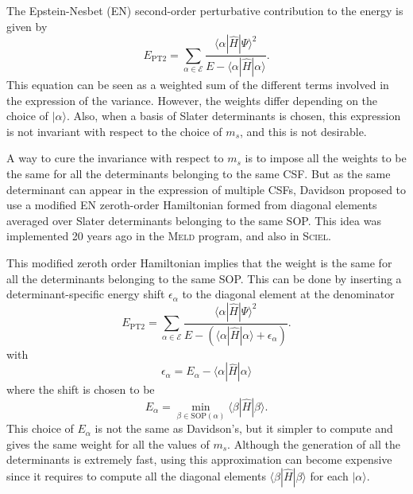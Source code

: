 \documentclass[aip,jcp,reprint,showkeys]{revtex4-1}
\newcommand{\ket}[1]{|#1\rangle}
\newcommand{\sop}{SOP}
\newcommand{\csf}{CSF}
\newcommand{\mel}[3]{\langle #1 | #2 | #3 \rangle}
\newcommand{\ept}{E_\text{PT2}}
\begin{document}
The Epstein-Nesbet (EN) second-order perturbative contribution to the energy is given
by
\begin{equation}
\ept = \sum_{\alpha \in \mathcal{E}} \frac{\mel{\alpha}{\hat{H}}{\Psi}^2}{E-\mel{\alpha}{\hat{H}}{\alpha}}.
\label{eq:pt2}
\end{equation}
This equation can be seen as a weighted sum of the different terms involved in
the expression of the variance. However, the weights differ depending on the
choice of $\ket{\alpha}$. Also, when a basis of Slater determinants is chosen,
this expression is not invariant with respect to the choice of $m_s$, and this 
is not desirable.

A way to cure the invariance with respect to $m_s$ is to impose all the weights
to be the same for all the determinants belonging to the same \csf . But as 
the same determinant can appear in the expression of multiple \csf s, Davidson
proposed to use a modified EN zeroth-order Hamiltonian formed from
diagonal elements averaged over Slater determinants belonging to the same
\sop . This idea was implemented 20 years ago in the \textsc{Meld} 
program,\cite{Davidson_1979,Kozlowski_1994} and also in \textsc{Sciel}.\cite{Sciel}

This modified zeroth order Hamiltonian implies that the weight is the same for
all the determinants belonging to the same \sop . This can be done by
inserting a determinant-specific energy shift $\epsilon_\alpha$ to the
diagonal element at the denominator 
\begin{equation}
\ept = \sum_{\alpha \in \mathcal{E}} \frac{\mel{\alpha}{\hat{H}}{\Psi}^2}{E-\left(\mel{\alpha}{\hat{H}}{\alpha}+\epsilon_\alpha \right)}.
\end{equation}
with
\begin{equation}
\epsilon_\alpha = E_\alpha - \mel{\alpha}{\hat{H}}{\alpha} 
\end{equation}
where the shift is chosen to be
\begin{equation}
E_\alpha = \min_{\beta \in \text{\sop}(\alpha)} \mel{\beta}{\hat{H}}{\beta}.
\end{equation}
This choice of $E_\alpha$ is not the same as Davidson's, but it simpler to compute
and gives the same weight for all the values of $m_s$.
Although the generation of all the determinants is extremely fast, using
this approximation can become expensive since it requires to compute
all the diagonal elements $\mel{\beta}{\hat{H}}{\beta}$ for each
$\ket{\alpha}$.
\end{document}
